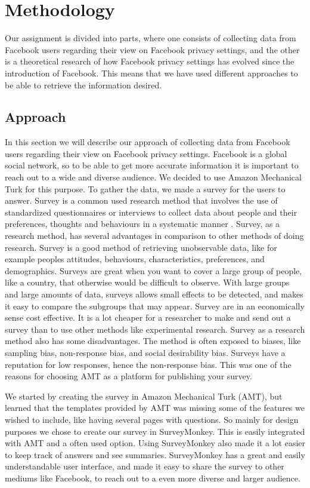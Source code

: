 \chapter{Methodology}
\label{chp:methodology} 

Our assignment is divided into parts, where one consists of collecting data from Facebook users regarding their view on Facebook privacy settings, and the other is a theoretical research of how Facebook privacy settings has evolved since the introduction of Facebook. This means that we have used different approaches to be able to retrieve the information desired.

\section{Approach}
In this section we will describe our approach of collecting data from Facebook users regarding their view on Facebook privacy settings. Facebook is a global social network, so to be able to get more accurate information it is important to reach out to a wide and diverse audience. We decided to use Amazon Mechanical Turk for this purpose. To gather the data, we made a survey for the users to answer. Survey is a common used research method that involves the use of standardized questionnaires or interviews to collect data about people and their preferences, thoughts and behaviours in a systematic manner \cite{survey}. Survey, as a research method, has several advantages in comparison to other methods of doing research. Survey is a good method of retrieving unobservable data, like for example peoples attitudes, behaviours, characteristics, preferences, and demographics. Surveys are great when you want to cover a large group of people, like a country, that otherwise would be difficult to observe. With large groups and large amounts of data, surveys allows small effects to be detected, and makes it easy to compare the subgroups that may appear. Survey are in an economically sense cost effective. It is a lot cheaper for a researcher to make and send out a survey than to use other methods like experimental research. Survey as a research method also has some disadvantages. The method is often exposed to biases, like sampling bias, non-response bias, and social desirability bias. Surveys have a reputation for low responses, hence the non-response bias. This was one of the reasons for choosing AMT as a platform for publishing your survey. 

We started by creating the survey in Amazon Mechanical Turk (AMT), but learned that the templates provided by AMT was missing some of the features we wished to include, like having several pages with questions. So mainly for design purposes we chose to create our survey in SurveyMonkey. This is easily integrated with AMT and a often used option.  Using SurveyMonkey also made it a lot easier to keep track of answers and see summaries. SurveyMonkey has a great and easily understandable user interface, and made it easy to share the survey to other mediums like Facebook, to reach out to a even more diverse and larger audience. 

